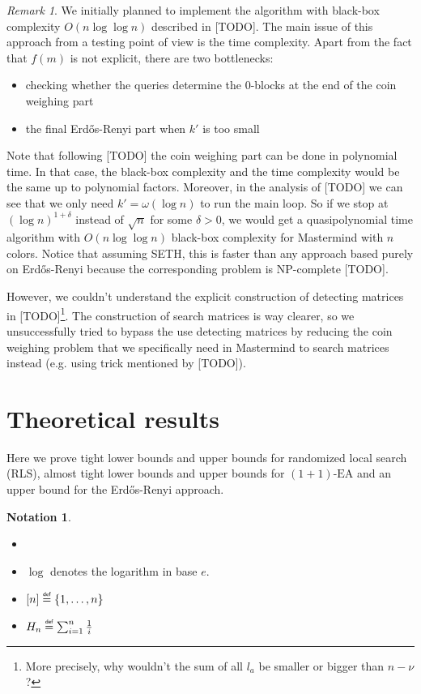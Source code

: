 \documentclass[12pt]{article}
\theoremstyle{definition}
\newtheorem*{notation}{Notation}
\theoremstyle{plain}
\theoremstyle{remark}
\newtheorem*{remark}{Remark}
\newcommand\mydef{\mathrel{\overset{\makebox[0pt]{\mbox{\normalfont\tiny\sffamily def}}}{=}}}
\begin{document}
\begin{remark}
	We initially planned to implement the algorithm with black-box complexity
	$O(n\log \log n)$ described in [TODO]. The main issue of this approach from
	a testing point of view is the time complexity. Apart from the fact that $f(m)$ is not
	explicit, there are two bottlenecks:

	\begin{itemize}
		\item checking whether the queries determine
		the 0-blocks at the end of the coin weighing part
		\item the final Erd\H{o}s-Renyi part when $k'$ is too small
	\end{itemize}

	Note that following [TODO] the coin weighing part can be done in polynomial time. In that case, the
	black-box complexity and the time complexity would be the same up to polynomial factors. Moreover,
	in the analysis of [TODO] we can see that we only need $k'=\omega(\log n)$ to run the main loop. So
	if we stop at $(\log n)^{1+\delta}$ instead of $\sqrt{n}$ for some $\delta>0$, we would get a
	quasipolynomial time algorithm with $O(n\log \log n)$ black-box complexity for Mastermind with $n$
	colors. Notice that assuming SETH, this is faster than any approach based purely on Erd\H{o}s-Renyi
	because the corresponding problem is NP-complete [TODO].

	However, we couldn't understand the explicit construction of detecting matrices in [TODO]\footnote{More
	precisely, why wouldn't the sum of all $l_a$ be smaller or bigger than $n-\nu$?}. The construction of
	search matrices is way clearer, so we unsuccessfully tried to bypass the use
	detecting matrices by reducing the coin weighing problem that we specifically need in Mastermind to search matrices
	instead (e.g. using trick mentioned by [TODO]).
		
\end{remark}

\section{Theoretical results}

Here we prove tight lower bounds and upper bounds for randomized local search (RLS), 
almost tight lower bounds and upper bounds for $(1+1)\text{-EA}$ and an upper bound
for the Erd\H{o}s-Renyi approach.

\begin{notation}
    \begin{itemize}
        \item[]
        \item $\log$ denotes the logarithm in base $e$.
        \item $[n]\mydef \{1,\ldots,n\}$
        \item $H_n\mydef \sum_{i=1}^n \frac{1}{i}$
    \end{itemize}
\end{notation}
\end{document}
